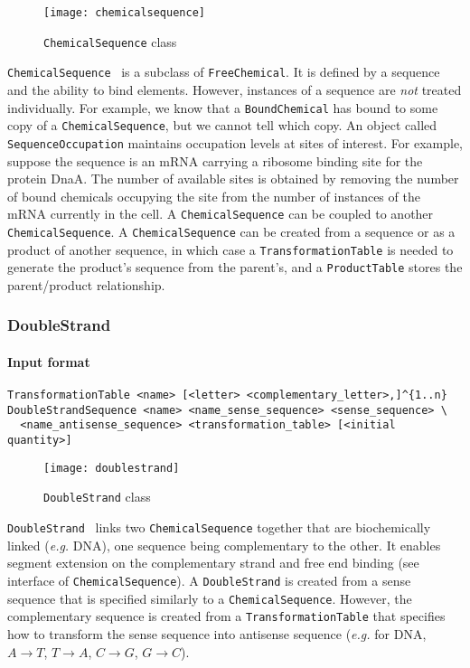 \begin{figure}[!h]
  \centering
  \texttt{[image: chemicalsequence]}
  \caption{\texttt{ChemicalSequence} class}
\label{fig:chemical_sequence}
\end{figure}

\texttt{ChemicalSequence}~ is a subclass of \texttt{FreeChemical}.
It is defined by a sequence and the ability to bind elements.
However, instances of a sequence are \emph{not} treated individually.
For example, we know that a \texttt{BoundChemical} has bound to some copy
of a \texttt{ChemicalSequence}, but we cannot tell which copy.
An object called \texttt{SequenceOccupation} maintains occupation levels at sites of interest.
For example, suppose the sequence is an mRNA carrying a ribosome binding site for the protein DnaA.
The number of available sites is obtained by removing the number of bound chemicals
occupying the site from the number of instances of the mRNA currently in the cell.
A \texttt{ChemicalSequence} can be coupled to another \texttt{ChemicalSequence}.
A \texttt{ChemicalSequence} can be created from a sequence or as a product of another sequence,
in which case a \texttt{TransformationTable} is needed to generate the product's sequence from the parent's,
and a \texttt{ProductTable} stores the parent/product relationship.

\subsubsection{DoubleStrand}

\paragraph{Input format}
\begin{verbatim}
TransformationTable <name> [<letter> <complementary_letter>,]^{1..n}
DoubleStrandSequence <name> <name_sense_sequence> <sense_sequence> \
  <name_antisense_sequence> <transformation_table> [<initial quantity>]
\end{verbatim}

\begin{figure}[!h]
  \centering
  \texttt{[image: doublestrand]}
  \caption{\texttt{DoubleStrand} class}
\label{fig:double_strand}
\end{figure}

\texttt{DoubleStrand}~ links two \texttt{ChemicalSequence}
together that are biochemically linked (\textit{e.g.} DNA), one sequence being complementary to the other.
It enables segment extension on the complementary strand and free end binding
(see interface of \texttt{ChemicalSequence}).
A \texttt{DoubleStrand} is created from a sense sequence that is specified similarly
to a \texttt{ChemicalSequence}.
However, the complementary sequence is created from a \texttt{TransformationTable}
that specifies how to transform the sense sequence into antisense sequence
(\textit{e.g.} for DNA, $A\rightarrow T$, $T\rightarrow A$, $C\rightarrow G$, $G\rightarrow C$).


